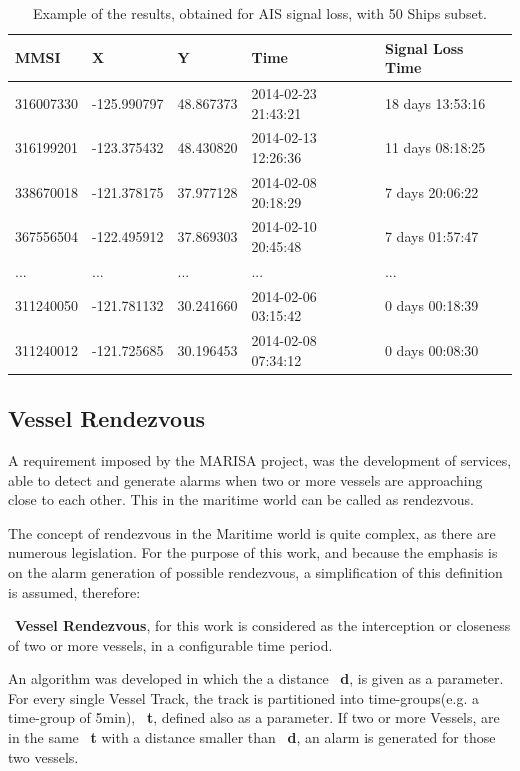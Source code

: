 \begin{table}[H]
\centering
\caption{Example of the results, obtained for AIS signal loss, with 50 Ships subset.}
\label{Table: AIS signal loss}
\begin{tabular}{@{}lllll@{}}
\toprule
MMSI & X & Y & Time & Signal Loss Time \\ \midrule
316007330 & -125.990797 & 48.867373 & 2014-02-23 21:43:21 & 18 days 13:53:16 \\
316199201 & -123.375432 & 48.430820 & 2014-02-13 12:26:36 & 11 days 08:18:25 \\
338670018 & -121.378175 & 37.977128 & 2014-02-08 20:18:29 & 7 days 20:06:22 \\
367556504 & -122.495912 & 37.869303 & 2014-02-10 20:45:48 & 7 days 01:57:47 \\
... & ... & ... & ... & ... \\
311240050 & -121.781132 & 30.241660 & 2014-02-06 03:15:42 & 0 days 00:18:39 \\
311240012 & -121.725685 & 30.196453 & 2014-02-08 07:34:12 & 0 days 00:08:30 \\ 
\bottomrule
\end{tabular}
\end{table}

\subsection{Vessel Rendezvous}
A requirement imposed by the MARISA project, was the development of services, able to detect and generate alarms when two or more vessels are approaching close to each other. This in the maritime world can be called as rendezvous.

The concept of rendezvous in the Maritime world is quite complex, as there are numerous legislation. For the purpose of this work, and because the emphasis is on the alarm generation of possible rendezvous, a simplification of this definition is assumed, therefore: 

~\textbf{Vessel Rendezvous}, for this work is considered as the interception or closeness of two or more vessels, in a configurable time period.

An algorithm was developed in which the a distance ~\textbf{d}, is given as a parameter. For every single Vessel Track, the track is partitioned into time-groups(e.g. a time-group of 5min), ~\textbf{t}, defined also as a parameter. If two or more Vessels, are in the same ~\textbf{t} with a distance smaller than ~\textbf{d}, an alarm is generated for those two vessels.

